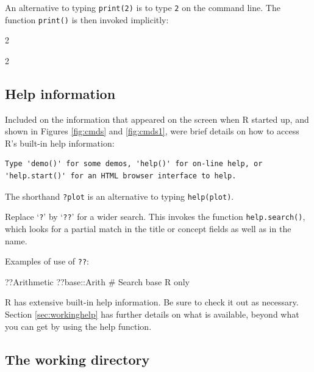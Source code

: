 \documentclass{tufte-book}\usepackage[]{graphicx}\usepackage[]{color}
\newcommand{\txtt}[1]{\texttt{#1}}
\begin{document}
An alternative to typing \txtt{print(2)} is to
type \txtt{2} on the command line.  The function \txtt{print()}
is then invoked implicitly:
\begin{Schunk}
\begin{Sinput}
2
\end{Sinput}
\begin{Soutput}
[1] 2
\end{Soutput}
\end{Schunk}

\subsection{Help information}\label{ss:ch1-help}

Included on the information that appeared on the screen when R started
up, and shown in Figures \ref{fig:cmds} and \ref{fig:cmds1}, were brief
details on how to access R's built-in help information:
{\small
\begin{verbatim}
Type 'demo()' for some demos, 'help()' for on-line help, or
'help.start()' for an HTML browser interface to help.
\end{verbatim}
}
\noindent
The shorthand \txtt{?plot} is an alternative to typing
\txtt{help(plot)}.

Replace `\txtt{?}' by `\txtt{??}' for a wider search.  This invokes
the function \txtt{help.search()}, which looks for a partial match
in the title or concept fields as well as in the name.
\begin{marginfigure}[-15pt]
Examples of use of \txtt{??}:\\[-5pt]
\begin{Schunk}
\begin{Sinput}
??Arithmetic
??base::Arith
  # Search base R only
\end{Sinput}
\end{Schunk}
\end{marginfigure}

R has extensive built-in help information.  Be sure to check it out
as necessary.  Section \ref{sec:workinghelp} has further details on
what is available, beyond what you can get by using the help function.

\subsection{The working directory}\label{ss:workdir}
\end{document}

